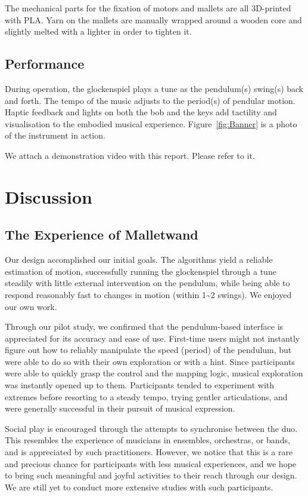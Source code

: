 \documentclass{nime-alternate} %
\begin{document}
The mechanical parts for the fixation of motors and mallets are all 3D-printed with PLA. Yarn on the mallets are manually wrapped around a wooden core and slightly melted with a lighter in order to tighten it.

\subsection{Performance}
During operation, the glockenspiel plays a tune as the pendulum(s) swing(s) back and forth. The tempo of the music adjusts to the period(s) of pendular motion. Haptic feedback and lights on both the bob and the keys add tactility and visualisation to the embodied musical experience. Figure~\ref{fig:Banner} is a photo of the instrument in action.

We attach a demonstration video with this report. Please refer to it.

\section{Discussion}

\subsection{The Experience of Malletwand}
Our design accomplished our initial goals. The algorithms yield a reliable estimation of motion, successfully running the glockenspiel through a tune steadily with little external intervention on the pendulum, while being able to respond reasonably fast to changes in motion (within 1\textasciitilde{}2 swings). We enjoyed our own work.

Through our pilot study, we confirmed that the pendulum-based interface is appreciated for its accuracy and ease of use. First-time users might not instantly figure out how to reliably manipulate the speed (period) of the pendulum, but were able to do so with their own exploration or with a hint. Since participants were able to quickly grasp the control and the mapping logic, musical exploration was instantly opened up to them. Participants tended to experiment with extremes before resorting to a steady tempo, trying gentler articulations, and were generally successful in their pursuit of musical expression.

Social play is encouraged through the attempts to synchronise between the duo. This resembles the experience of musicians in ensembles, orchestras, or bands, and is appreciated by such practitioners. However, we notice that this is a rare and precious chance for participants with less musical experiences, and we hope to bring such meaningful and joyful activities to their reach through our design. We are still yet to conduct more extensive studies with such participants.
\end{document}
